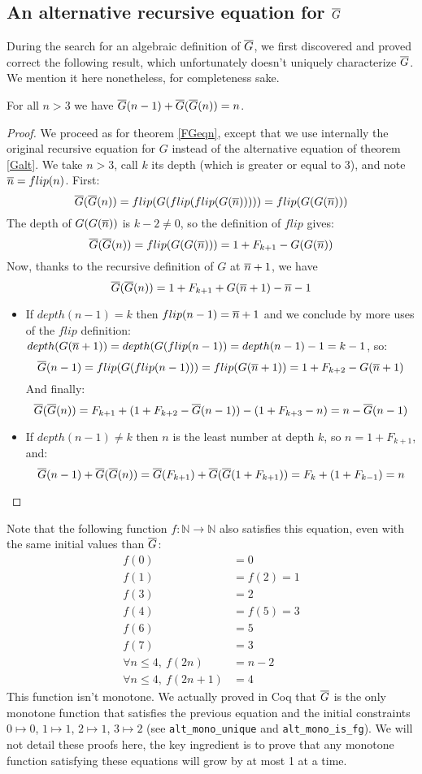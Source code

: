 \documentclass[a4paper,11pt]{article}
\begin{document}
\subsection{An alternative recursive equation for $\overline{G}$}

During the search for an algebraic definition of $\overline{G}$, we
first discovered and proved correct the following result,
which unfortunately doesn't uniquely characterize $\overline{G}$.
We mention it here nonetheless, for completeness sake.

\begin{theorem}
For all $n>3$ we have $\overline{G}(n-1) +\overline{G}(\overline{G}(n)) = n$.
\end{theorem}
\begin{proof}
We proceed as for theorem \ref{FGeqn}, except that we
use internally the original recursive equation for $G$
instead of the alternative equation of theorem \ref{Galt}.
We take $n>3$, call $k$ its depth (which is greater or equal to 3),
and note $\overline{n} = flip(n)$. First:
$$\overline{G}(\overline{G}(n))=flip(G(flip(flip(G(\overline{n})))))=flip(G(G(\overline{n})))$$
The depth of $G(G(\overline{n}))$ is $k-2\neq 0$, so the definition
of $flip$ gives:
$$\overline{G}(\overline{G}(n)) = flip(G(G(\overline{n}))) = 1+F_{k+1}-G(G(\overline{n}))$$
Now, thanks to the recursive definition of $G$ at $\overline{n}+1$, we have
$$\overline{G}(\overline{G}(n)) = 1+F_{k+1}+G(\overline{n}+1)-\overline{n}-1$$
\begin{itemize}
\item If $depth(n-1)=k$ then $flip(n-1)=\overline{n}+1$ and we
conclude by more uses of the $flip$ definition:
$depth(G(\overline{n}+1))=depth(G(flip(n-1))=depth(n-1)-1=k-1$, so:
$$\overline{G}(n-1)=flip(G(flip(n-1)))=flip(G(\overline{n}+1))= 1+F_{k+2}-G(\overline{n}+1)$$
And finally:
$$\overline{G}(\overline{G}(n)) = F_{k+1} + (1+F_{k+2}-\overline{G}(n-1))-(1+F_{k+3}-n) = n-\overline{G}(n-1)$$

\item If $depth(n-1)\neq k$ then $n$ is the least number at
depth $k$, so $n=1+F_{k+1}$, and:
$$\overline{G}(n-1) + \overline{G}(\overline{G}(n)) = \overline{G}(F_{k+1})+\overline{G}(\overline{G}(1+F_{k+1})) =
F_{k}+(1+F_{k-1}) = n$$
\end{itemize}
\end{proof}

Note that the following function $f:\mathbb{N}\to\mathbb{N}$
also satisfies this equation, even with the same initial
values than $\overline{G}$:
\begin{align*}
   f(0) & = 0 \\
   f(1) & = f(2)=1  \\
   f(3) & = 2 \\
   f(4) & =f(5) = 3 \\
   f(6) & = 5 \\
   f(7) & = 3 \\
 \forall n\le 4, ~ f(2n) & = n-2 \\
 \forall n\le 4, ~ f(2n+1) & = 4
\end{align*}
This function isn't monotone. We actually proved in Coq that
$\overline{G}$ is the only monotone function that satisfies the previous
equation and the initial constraints $0\mapsto 0$, $1\mapsto 1$, $2\mapsto 1$, $3\mapsto
2$ (see {\tt alt\_mono\_unique} and {\tt alt\_mono\_is\_fg}).
We will not detail these proofs here, the key ingredient is to
prove that any monotone function satisfying these equations
will grow by at most 1 at a time.
\end{document}
